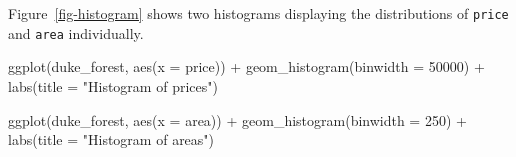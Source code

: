 \documentclass[
  letterpaper,
  DIV=11,
  numbers=noendperiod]{scrartcl}
\newenvironment{Shaded}{\begin{snugshade}}{\end{snugshade}}
\newcommand{\AttributeTok}[1]{\textcolor[rgb]{0.40,0.45,0.13}{#1}}
\newcommand{\DecValTok}[1]{\textcolor[rgb]{0.68,0.00,0.00}{#1}}
\newcommand{\FunctionTok}[1]{\textcolor[rgb]{0.28,0.35,0.67}{#1}}
\newcommand{\NormalTok}[1]{\textcolor[rgb]{0.00,0.23,0.31}{#1}}
\newcommand{\SpecialCharTok}[1]{\textcolor[rgb]{0.37,0.37,0.37}{#1}}
\newcommand{\StringTok}[1]{\textcolor[rgb]{0.13,0.47,0.30}{#1}}
\begin{document}
Figure~\ref{fig-histogram} shows two histograms displaying the
distributions of \texttt{price} and \texttt{area} individually.

\begin{Shaded}
\begin{Highlighting}[]
\FunctionTok{ggplot}\NormalTok{(duke\_forest, }\FunctionTok{aes}\NormalTok{(}\AttributeTok{x =}\NormalTok{ price)) }\SpecialCharTok{+}
  \FunctionTok{geom\_histogram}\NormalTok{(}\AttributeTok{binwidth =} \DecValTok{50000}\NormalTok{) }\SpecialCharTok{+}
  \FunctionTok{labs}\NormalTok{(}\AttributeTok{title =} \StringTok{"Histogram of prices"}\NormalTok{)}

\FunctionTok{ggplot}\NormalTok{(duke\_forest, }\FunctionTok{aes}\NormalTok{(}\AttributeTok{x =}\NormalTok{ area)) }\SpecialCharTok{+}
  \FunctionTok{geom\_histogram}\NormalTok{(}\AttributeTok{binwidth =} \DecValTok{250}\NormalTok{) }\SpecialCharTok{+}
  \FunctionTok{labs}\NormalTok{(}\AttributeTok{title =} \StringTok{"Histogram of areas"}\NormalTok{)}
\end{Highlighting}
\end{Shaded}
\end{document}
